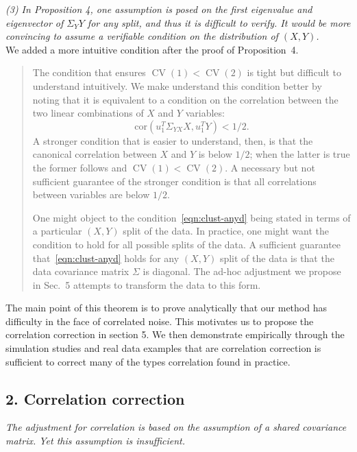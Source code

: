 \documentclass[11pt]{article}
\newcommand{\CV}{\operatorname{CV}}
\newcommand{\T}{T}
\begin{document}
\noindent
\emph{(3) In Proposition 4, one assumption is posed on the first eigenvalue
and eigenvector of $\Sigma_YY$ for any split, and thus it is difficult to
verify. It would be more convincing to assume a verifiable condition on the
distribution of $(X, Y)$.}
\\

We added a more intuitive condition after the proof of Proposition~4.

\begin{quote}
    The condition that ensures $\CV(1) < \CV(2)$ is tight but difficult to
understand intuitively. We make understand this condition better by
noting that it is equivalent to a condition on the correlation between the
two linear combinations of $X$ and $Y$ variables:
\begin{equation}\label{eqn:clust-anyd}
    \mathrm{cor}(u_1^\T \Sigma_{YX} X, u_1^\T Y) < 1/2.
\end{equation}
A stronger condition that is easier to understand, then, is that the canonical
correlation between $X$ and $Y$ is below $1/2$; when the latter is true the
former follows and $\CV(1) < \CV(2)$. A necessary but not sufficient
guarantee of the stronger condition is that all correlations between variables
are below $1/2$.


One might object to the condition~\eqref{eqn:clust-anyd} being stated in terms
of a particular $(X, Y)$ split of the data.  In practice, one might want the
condition to hold for all possible splits of the data. A sufficient guarantee
that~\eqref{eqn:clust-anyd} holds for any $(X, Y)$ split of the data is that
the data covariance matrix $\Sigma$ is diagonal. The ad-hoc adjustment we
propose in Sec.~5 attempts to transform the data to this form.
\end{quote}

The main point of this theorem is to prove analytically that our method has
difficulty in the face of correlated noise. This motivates us to propose the
correlation correction in section 5. We then demonstrate empirically through
the simulation studies and real data examples that are correlation correction
is sufficient to correct many of the types correlation found in practice.



\subsection{2. Correlation correction}

\emph{The adjustment for correlation is based on the assumption of a
shared covariance matrix. Yet this assumption is insufficient.}
\\
\end{document}

